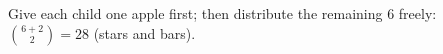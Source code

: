 Give each child one apple first; then distribute the remaining $6$ freely: $\binom{6+2}{2}=\boxed{28}$ (stars and bars).
